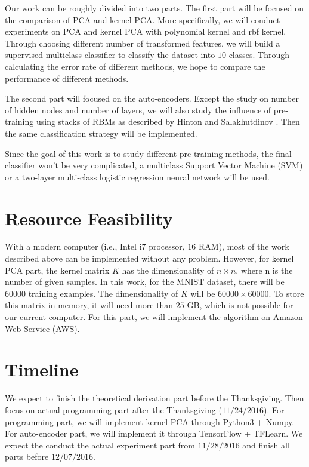 \documentclass{article}
\begin{document}
Our work can be roughly divided into two parts. The first part will be focused on the comparison of PCA and kernel PCA. More specifically, we will conduct experiments on PCA and kernel PCA with polynomial kernel and rbf kernel. Through choosing different number of transformed features, we will build a supervised multiclass classifier to classify the dataset into $10$ classes. Through calculating the error rate of different methods, we hope to compare the performance of different methods.

The second part will focused on the auto-encoders. Except the study on number of hidden nodes and number of layers, we will also study the influence of pre-training using stacks of RBMs as described by Hinton and Salakhutdinov \cite{hinton2006reducing}. Then the same classification strategy will be implemented.

Since the goal of this work is to study different pre-training methods, the final classifier won't be very complicated, a multiclass Support Vector Machine (SVM) or a two-layer multi-class logistic regression neural network will be used.

\section{Resource Feasibility}
\label{sec:feasibility}

With a modern computer (i.e., Intel i$7$ processor, $16$ RAM), most of the work described above can be implemented without any problem. However, for kernel PCA part, the kernel matrix $K$ has the dimensionality of $n \times n$, where n is the number of given samples. In this work, for the MNIST dataset, there will be $60000$ training examples. The dimensionality of $K$ will be $60000 \times 60000$. To store this matrix in memory, it will need more than $25$ GB, which is not possible for our current computer. For this part, we will implement the algorithm on Amazon Web Service (AWS).

\section{Timeline}
\label{sec:timeline}

We expect to finish the theoretical derivation part before the Thanksgiving. Then focus on actual programming part after the Thanksgiving ($11/24/2016$). For programming part, we will implement kernel PCA through Python3 + Numpy. For auto-encoder part, we will implement it through TensorFlow + TFLearn. We expect the conduct the actual experiment part from $11/28/2016$ and finish all parts before $12/07/2016$.

\vfill\pagebreak


%

\end{document}
